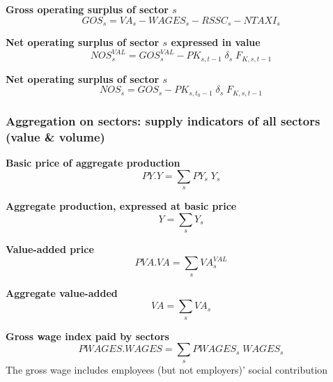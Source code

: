 \documentclass[12pt]{article}
\numberwithin{equation}{section}
\begin{document}
\noindent\textbf{Gross operating surplus of sector $s$} \\
\begin{dmath}
GOS_{s} = VA_{s} - WAGES_{s} - RSSC_{s} - NTAXI_{s}
\end{dmath}

\noindent\textbf{Net operating surplus of sector $s$ expressed in value} \\
\begin{dmath}
NOS^{VAL}_{s} = GOS^{VAL}_{s} - PK_{s, t-1} \; \delta_{s} \; F_{K, s, t-1}
\end{dmath}

\noindent\textbf{Net operating surplus of sector $s$} \\
\begin{dmath}
NOS_{s} = GOS_{s} - PK_{s, t_{0}-1} \; \delta_{s} \; F_{K, s, t-1}
\end{dmath}




\subsubsection{Aggregation on sectors: supply indicators of all sectors  (value \& volume)}



\noindent\textbf{Basic price of aggregate production} \\
\begin{dmath}
PY . Y = \sum_{s} PY_{s} \; Y_{s}
\end{dmath}

\noindent\textbf{Aggregate production, expressed at basic price} \\
\begin{dmath}
Y = \sum_{s} Y_{s}
\end{dmath}

\noindent\textbf{Value-added price} \\
\begin{dmath}
PVA . VA = \sum_{s} VA^{VAL}_{s}
\end{dmath}

\noindent\textbf{Aggregate value-added} \\
\begin{dmath}
VA = \sum_{s} VA_{s}
\end{dmath}

\noindent\textbf{Gross wage index paid by sectors} \\
\begin{dmath}
PWAGES . WAGES = \sum_{s} PWAGES_{s} \; WAGES_{s}
\end{dmath}
The gross wage includes employees (but not employers)' social contribution \\
\end{document}
